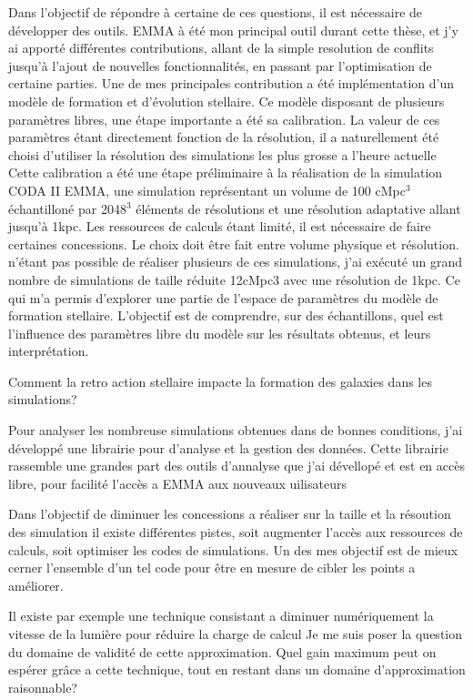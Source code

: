 Dans l'objectif de répondre à certaine de ces questions, il est nécessaire de développer des outils.
EMMA à été mon principal outil durant cette thèse, et j'y ai apporté différentes contributions, allant de la simple resolution de conflits jusqu'à l'ajout de nouvelles fonctionnalités, en passant par l'optimisation de certaine parties.
Une de mes principales contribution a été implémentation d'un modèle de formation et d'évolution stellaire.
Ce modèle disposant de plusieurs paramètres libres, une étape importante a été sa calibration.
La valeur de ces paramètres étant directement fonction de la résolution, il a naturellement été choisi d'utiliser la résolution des simulations les plus grosse a l'heure actuelle 
Cette calibration a été une étape préliminaire à la réalisation de la simulation CODA II EMMA, une simulation représentant un volume de 100 cMpc$^3$ échantilloné par 2048$^3$ éléments de résolutions et une résolution adaptative allant jusqu'à 1kpc.
Les ressources de calculs étant limité, il est nécessaire de faire certaines concessions.
Le choix doit être fait entre volume physique et résolution.
n'étant pas possible de réaliser plusieurs de ces simulations, j'ai exécuté un grand nombre de simulations de taille réduite 12cMpc3 avec une résolution de 1kpc. 
Ce qui m'a permis d'explorer une partie de l'espace de paramètres du modèle de formation stellaire.
L'objectif est de comprendre, sur des échantillons, quel est l'influence des paramètres libre du modèle sur les résultats obtenus, et leurs interprétation.

Comment la retro action stellaire impacte la formation des galaxies dans les simulations?

Pour analyser les nombreuse simulations obtenues dans de bonnes conditions, j'ai développé une librairie pour d'analyse et la gestion des données.
Cette librairie rassemble une grandes part des outils d'annalyse que j'ai dévellopé et est en accès libre, pour facilité l'accès a EMMA aux nouveaux uilisateurs


Dans l'objectif de diminuer les concessions a réaliser sur la taille et la résoution des simulation
il existe différentes pistes, soit augmenter l'accès aux ressources de calculs, soit optimiser les codes de simulations.
Un des mes objectif est de mieux cerner l'ensemble d'un tel code pour être en mesure de cibler les points a améliorer.

Il existe par exemple une technique consistant a diminuer numériquement  la vitesse de la lumière pour réduire la charge de calcul
Je me suis poser la question du domaine de validité de cette approximation.
Quel gain maximum peut on espérer grâce a cette technique, tout en restant dans un domaine d'approximation raisonnable?

